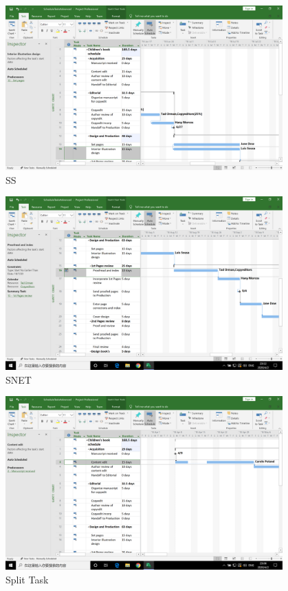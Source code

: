 \documentclass[11pt]{article}
\begin{document}
\begin{figure}[H]
    \centering
    \includegraphics[width=0.95\textwidth]{SS}
    \caption{SS}
\end{figure}
\begin{figure}[H]
    \centering
    \includegraphics[width=0.95\textwidth]{SNET}
    \caption{SNET}
\end{figure}
\begin{figure}[H]
    \centering
    \includegraphics[width=0.95\textwidth]{split}
    \caption{Split Task}
\end{figure}
\end{document}
